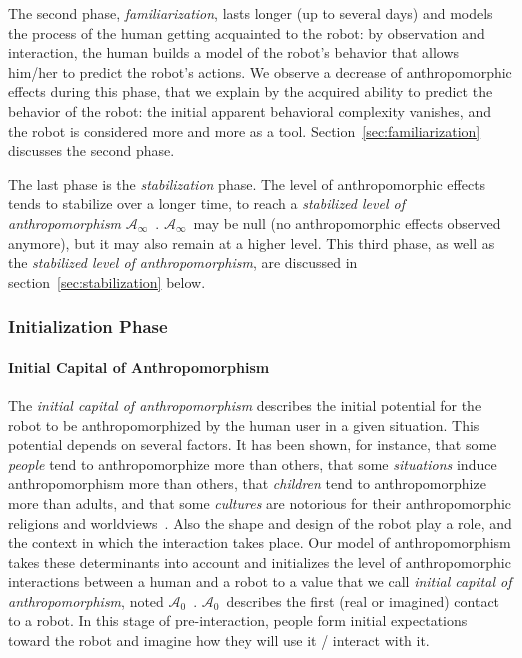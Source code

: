 \documentclass{frontiersSCNS} %
\newcommand{\ICA}{{$\mathcal{A}_0$~}}
\newcommand{\SLA}{{$\mathcal{A}_\infty$~}}
\begin{document}
The second phase, \emph{familiarization}, lasts longer (up to several days) and
models the process of the human getting acquainted to the robot: by observation
and interaction, the human builds a model of the robot's behavior that allows
him/her to predict the robot's actions. We observe a decrease of
anthropomorphic effects during this phase, that we explain by the acquired
ability to predict the behavior of the robot: the initial apparent behavioral
complexity vanishes, and the robot is considered more and more as a tool.
Section~\ref{sec:familiarization} discusses the second phase.

The last phase is the \emph{stabilization} phase. The level of anthropomorphic
effects tends to stabilize over a longer time, to reach a \emph{stabilized
level of anthropomorphism} \SLA. \SLA may be null (no anthropomorphic
effects observed anymore), but it may also remain at a higher level.  This
third phase, as well as the \emph{stabilized level of anthropomorphism}, are
discussed in section~\ref{sec:stabilization} below.

\subsubsection{Initialization Phase}
\label{sec:initialization}

\paragraph{Initial Capital of Anthropomorphism}
\label{sec:ica}

The \emph{initial capital of anthropomorphism} describes the initial potential
for the robot to be anthropomorphized by the human user in a given situation.
This potential depends on several factors. It has been shown, for instance, that
some \textit{people} tend to anthropomorphize more than others, that some
\textit{situations} induce anthropomorphism more than others, that
\textit{children} tend to anthropomorphize more than adults, and that some
\textit{cultures} are notorious for their anthropomorphic religions and
worldviews~\cite{epley_when_2008}. Also the shape and design of the robot play a
role, and the context in which the interaction takes place. Our model of
anthropomorphism takes these determinants into account and initializes the level
of anthropomorphic interactions between a human and a robot to a value that we
call \emph{initial capital of anthropomorphism}, noted \ICA. \ICA describes the
first (real or imagined) contact to a robot. In this stage of pre-interaction,
people form initial expectations toward the robot and imagine how they will use
it / interact with it.
\end{document}
